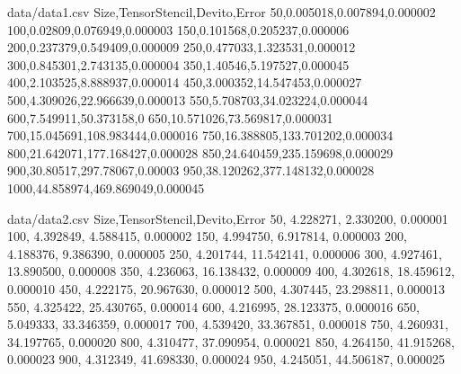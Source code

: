 \begin{filecontents*}{data/data1.csv}
	Size,TensorStencil,Devito,Error
	50,0.005018,0.007894,0.000002
	100,0.02809,0.076949,0.000003
	150,0.101568,0.205237,0.000006
	200,0.237379,0.549409,0.000009
	250,0.477033,1.323531,0.000012
	300,0.845301,2.743135,0.000004
	350,1.40546,5.197527,0.000045
	400,2.103525,8.888937,0.000014
	450,3.000352,14.547453,0.000027
	500,4.309026,22.966639,0.000013
	550,5.708703,34.023224,0.000044
	600,7.549911,50.373158,0
	650,10.571026,73.569817,0.000031
	700,15.045691,108.983444,0.000016
	750,16.388805,133.701202,0.000034
	800,21.642071,177.168427,0.000028
	850,24.640459,235.159698,0.000029
	900,30.80517,297.78067,0.00003
	950,38.120262,377.148132,0.000028
	1000,44.858974,469.869049,0.000045
\end{filecontents*}

\begin{filecontents*}{data/data2.csv}
	Size,TensorStencil,Devito,Error
	50, 4.228271, 2.330200, 0.000001
	100, 4.392849, 4.588415, 0.000002
	150, 4.994750, 6.917814, 0.000003
	200, 4.188376, 9.386390, 0.000005
	250, 4.201744, 11.542141, 0.000006
	300, 4.927461, 13.890500, 0.000008
	350, 4.236063, 16.138432, 0.000009
	400, 4.302618, 18.459612, 0.000010
	450, 4.222175, 20.967630, 0.000012
	500, 4.307445, 23.298811, 0.000013
	550, 4.325422, 25.430765, 0.000014
	600, 4.216995, 28.123375, 0.000016
	650, 5.049333, 33.346359, 0.000017
	700, 4.539420, 33.367851, 0.000018
	750, 4.260931, 34.197765, 0.000020
	800, 4.310477, 37.090954, 0.000021
	850, 4.264150, 41.915268, 0.000023
	900, 4.312349, 41.698330, 0.000024
	950, 4.245051, 44.506187, 0.000025
\end{filecontents*}

